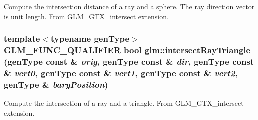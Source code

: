 Compute the intersection distance of a ray and a sphere. The ray direction vector is unit length. From GLM\_\-GTX\_\-intersect extension. \hypertarget{group__gtx__intersect_gbf48f0fca6a10a8edb001b3d546de5fe}{
\subsubsection[intersectRayTriangle]{\setlength{\rightskip}{0pt plus 5cm}template$<$typename genType$>$ GLM\_\-FUNC\_\-QUALIFIER bool glm::intersectRayTriangle (genType const \& {\em orig}, \/  genType const \& {\em dir}, \/  genType const \& {\em vert0}, \/  genType const \& {\em vert1}, \/  genType const \& {\em vert2}, \/  genType \& {\em baryPosition})}}
\label{group__gtx__intersect_gbf48f0fca6a10a8edb001b3d546de5fe}


Compute the intersection of a ray and a triangle. From GLM\_\-GTX\_\-intersect extension. 